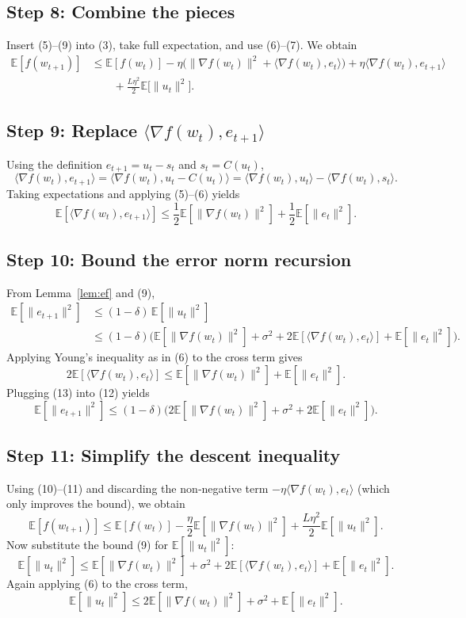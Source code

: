\documentclass{article}
\newcommand{\E}{\mathbb{E}}
\begin{document}
\subsection*{Step 8: Combine the pieces}
Insert (5)–(9) into (3), take full expectation, and use (6)–(7). We obtain
\[
\begin{aligned}
\E[f(w_{t+1})]
&\le \E[f(w_t)]
   -\eta\Big(\|\nabla f(w_t)\|^2
          +\langle\nabla f(w_t),e_t\rangle\Big)
   +\eta\langle\nabla f(w_t),e_{t+1}\rangle   \\
&\qquad
   +\frac{L\eta^2}{2}\E\big[\|u_t\|^2\big] .
\end{aligned}
\tag{10}
\]

\subsection*{Step 9: Replace $\langle\nabla f(w_t),e_{t+1}\rangle$}
Using the definition $e_{t+1}=u_t-s_t$ and $s_t=C(u_t)$,
\[
\langle\nabla f(w_t),e_{t+1}\rangle
= \langle\nabla f(w_t),u_t-C(u_t)\rangle
= \langle\nabla f(w_t),u_t\rangle-\langle\nabla f(w_t),s_t\rangle .
\]
Taking expectations and applying (5)–(6) yields
\[
\E[\langle\nabla f(w_t),e_{t+1}\rangle]
\le \frac{1}{2}\E[\|\nabla f(w_t)\|^2]
   +\frac{1}{2}\E[\|e_t\|^2] .
\tag{11}
\]

\subsection*{Step 10: Bound the error norm recursion}
From Lemma~\ref{lem:ef} and (9),
\[
\begin{aligned}
\E[\|e_{t+1}\|^2]
&\le (1-\delta)\,\E[\|u_t\|^2] \\
&\le (1-\delta)\big(\E[\|\nabla f(w_t)\|^2] + \sigma^2
      + 2\E[\langle\nabla f(w_t),e_t\rangle]
      + \E[\|e_t\|^2]\big) .
\end{aligned}
\tag{12}
\]
Applying Young’s inequality as in (6) to the cross term gives
\[
2\E[\langle\nabla f(w_t),e_t\rangle]
\le \E[\|\nabla f(w_t)\|^2] + \E[\|e_t\|^2] .
\tag{13}
\]
Plugging (13) into (12) yields
\[
\E[\|e_{t+1}\|^2]
\le (1-\delta)\big(2\E[\|\nabla f(w_t)\|^2] + \sigma^2 + 2\E[\|e_t\|^2]\big).
\tag{14}
\]

\subsection*{Step 11: Simplify the descent inequality}
Using (10)–(11) and discarding the non‑negative term $-\eta\langle\nabla f(w_t),e_t\rangle$ (which only improves the bound), we obtain
\[
\E[f(w_{t+1})]
\le \E[f(w_t)]
   -\frac{\eta}{2}\E[\|\nabla f(w_t)\|^2]
   +\frac{L\eta^2}{2}\E[\|u_t\|^2] .
\tag{15}
\]
Now substitute the bound (9) for $\E[\|u_t\|^2]$:
\[
\E[\|u_t\|^2]
\le \E[\|\nabla f(w_t)\|^2] + \sigma^2
   + 2\E[\langle\nabla f(w_t),e_t\rangle]
   + \E[\|e_t\|^2] .
\]
Again applying (6) to the cross term,
\[
\E[\|u_t\|^2]
\le 2\E[\|\nabla f(w_t)\|^2] + \sigma^2 + \E[\|e_t\|^2] .
\tag{16}
\]
\end{document}
